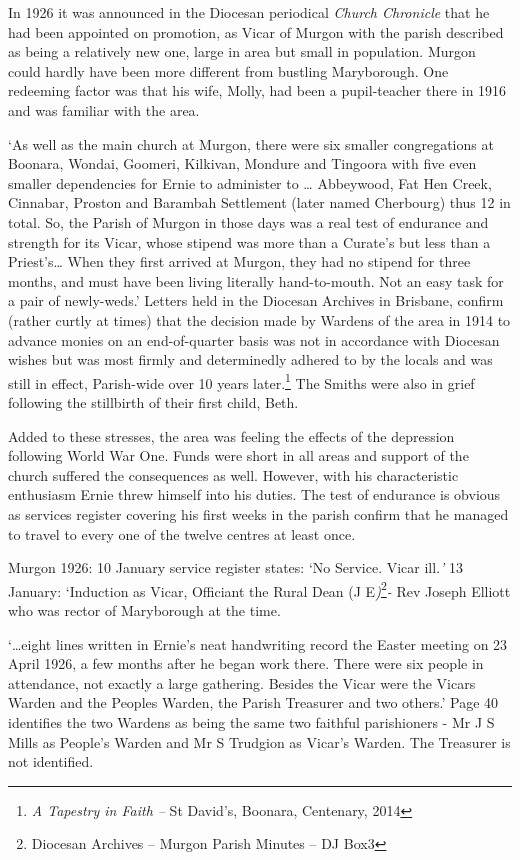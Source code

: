In 1926 it was announced in the Diocesan periodical \emph{Church
Chronicle} that he had been appointed on promotion, as Vicar of Murgon
with the parish described as being a relatively new one, large in area
but small in population. Murgon could hardly have been more different
from bustling Maryborough. One redeeming factor was that his wife,
Molly, had been a pupil-teacher there in 1916 and was familiar with the
area.

`As well as the main church at Murgon, there were six smaller
congregations at Boonara, Wondai, Goomeri, Kilkivan, Mondure and
Tingoora with five even smaller dependencies for Ernie to administer to
\ldots{} Abbeywood, Fat Hen Creek, Cinnabar, Proston and Barambah
Settlement (later named Cherbourg) thus 12 in total. So, the Parish of
Murgon in those days was a real test of endurance and strength for its
Vicar, whose stipend was more than a Curate's but less than a
Priest's\ldots{} When they first arrived at Murgon, they had no stipend
for three months, and must have been living literally hand-to-mouth. Not
an easy task for a pair of newly-weds.' Letters held in the Diocesan
Archives in Brisbane, confirm (rather curtly at times) that the decision
made by Wardens of the area in 1914 to advance monies on an
end-of-quarter basis was not in accordance with Diocesan wishes but was
most firmly and determinedly adhered to by the locals and was still in
effect, Parish-wide over 10 years later.\footnote{\emph{A Tapestry in
  Faith --} St David's, Boonara, Centenary, 2014} The Smiths were also
in grief following the stillbirth of their first child, Beth.

Added to these stresses, the area was feeling the effects of the
depression following World War One. Funds were short in all areas and
support of the church suffered the consequences as well. However, with
his characteristic enthusiasm Ernie threw himself into his duties. The
test of endurance is obvious as services register covering his first
weeks in the parish confirm that he managed to travel to every one of
the twelve centres at least once.

Murgon 1926: 10 January service register states: `No Service. Vicar
ill.\emph{'} 13 January: `Induction as Vicar, Officiant the Rural Dean
(J E\emph{)}\footnote{Diocesan Archives -- Murgon Parish Minutes -- DJ
  Box3}\emph{-} Rev Joseph Elliott who was rector of Maryborough at the
time.

`\ldots eight lines written in Ernie's neat handwriting record the
Easter meeting on 23 April 1926, a few months after he began work there.
There were six people in attendance, not exactly a large gathering.
Besides the Vicar were the Vicars Warden and the Peoples Warden, the
Parish Treasurer and two others.' Page 40 identifies the two Wardens as
being the same two faithful parishioners - Mr J S Mills as People's
Warden and Mr S Trudgion as Vicar's Warden. The Treasurer is not
identified.

